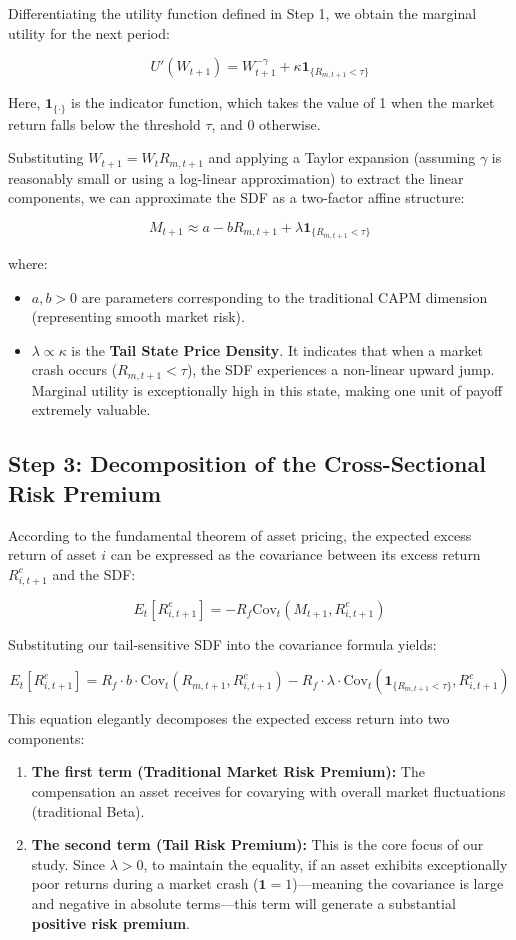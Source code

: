 \documentclass[12pt]{article}
\begin{document}
Differentiating the utility function defined in Step 1, we obtain the marginal utility for the next period:

$$U'(W_{t+1}) = W_{t+1}^{-\gamma} + \kappa \mathbf{1}_{\{R_{m,t+1} < \tau\}}$$

Here, $\mathbf{1}_{\{ \cdot \}}$ is the indicator function, which takes the value of 1 when the market return falls below the threshold $\tau$, and 0 otherwise.

Substituting $W_{t+1} = W_t R_{m,t+1}$ and applying a Taylor expansion (assuming $\gamma$ is reasonably small or using a log-linear approximation) to extract the linear components, we can approximate the SDF as a two-factor affine structure:

$$M_{t+1} \approx a - b R_{m,t+1} + \lambda \mathbf{1}_{\{R_{m,t+1} < \tau\}}$$

where:
\begin{itemize}
    \item $a, b > 0$ are parameters corresponding to the traditional CAPM dimension (representing smooth market risk).
    \item $\lambda \propto \kappa$ is the \textbf{Tail State Price Density}. It indicates that when a market crash occurs ($R_{m,t+1} < \tau$), the SDF experiences a non-linear upward jump. Marginal utility is exceptionally high in this state, making one unit of payoff extremely valuable.
\end{itemize}

\subsection{Step 3: Decomposition of the Cross-Sectional Risk Premium}

According to the fundamental theorem of asset pricing, the expected excess return of asset $i$ can be expressed as the covariance between its excess return $R_{i,t+1}^e$ and the SDF:

$$E_t[R_{i,t+1}^e] = -R_f \text{Cov}_t(M_{t+1}, R_{i,t+1}^e)$$

Substituting our tail-sensitive SDF into the covariance formula yields:

$$E_t[R_{i,t+1}^e] = R_f \cdot b \cdot \text{Cov}_t(R_{m,t+1}, R_{i,t+1}^e) - R_f \cdot \lambda \cdot \text{Cov}_t(\mathbf{1}_{\{R_{m,t+1} < \tau\}}, R_{i,t+1}^e)$$

This equation elegantly decomposes the expected excess return into two components:
\begin{enumerate}
    \item \textbf{The first term (Traditional Market Risk Premium):} The compensation an asset receives for covarying with overall market fluctuations (traditional Beta).
    \item \textbf{The second term (Tail Risk Premium):} This is the core focus of our study. Since $\lambda > 0$, to maintain the equality, if an asset exhibits exceptionally poor returns during a market crash ($\mathbf{1} = 1$)—meaning the covariance is large and negative in absolute terms—this term will generate a substantial \textbf{positive risk premium}.
\end{enumerate}
\end{document}
